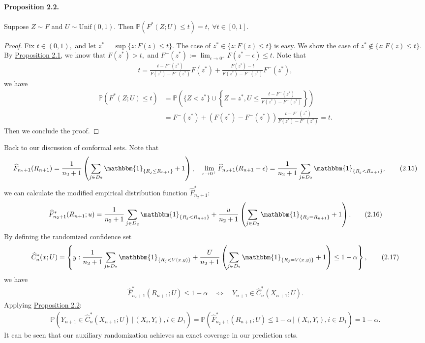 \documentclass{article}
\numberwithin{equation}{section}
\begin{document}
\paragraph{Proposition 2.2.\label{Proposition 2.2}} Suppose $Z\sim F$ and $U\sim\mathrm{Unif}(0,1)$. Then $\mathbb{P}(F^*(Z;U)\leq t) = t,\ \forall t\in [0,1]$.
\begin{proof}
Fix $t\in(0,1),$ and let $z^*=\sup\{z:F(z)\leq t\}.$ The case of $z^*\in\{z:F(z)\leq t\}$ is easy. We show the case of $z^*\notin\{z:F(z)\leq t\}.$ By \hyperref[Proposition 2.1]{Proposition 2.1}, we know that $F(z^*)>t,$ and $F^-(z^*):=\lim_{\epsilon\to 0^+}F(z^*-\epsilon) \leq t.$
Note that 
\begin{align*}
	t = \frac{t-F^-(z^*)}{F(z^*) - F^-(z^*)}F(z^*) + \frac{F(z^*) - t}{F(z^*) - F^-(z^*)}F^-(z^*),\tag{2.13}
\end{align*}
we have
\begin{align*}
	\mathbb{P}(F^*(Z;U)\leq t) &= \mathbb{P}\left(\{Z < z^*\}\cup\left\{Z=z^*,U\leq \frac{t-F^-(z^*)}{F(z^*) - F^-(z^*)}\right\}\right)\\
	&= F^-(z^*) + \left(F(z^*) - F^-(z^*)\right)\frac{t-F^-(z^*)}{F(z^*) - F^-(z^*)} = t.\tag{2.14}
\end{align*}
Then we conclude the proof.
\end{proof}

Back to our discussion of conformal sets. Note that
\begin{align*}
	\widehat{F}_{n_2+1}(R_{n+1}) = \frac{1}{n_2+1}\left(\sum_{j\in D_2}\mathbbm{1}_{\{R_j\leq R_{n+1}\}}+1\right),\quad
	\lim_{\epsilon\to 0^+}\widehat{F}_{n_2+1}(R_{n+1}-\epsilon) = \frac{1}{n_2+1}\sum_{j\in D_2}\mathbbm{1}_{\{R_j< R_{n+1}\}},\tag{2.15}
\end{align*}
we can calculate the modified empirical distribution function $\widehat{F}^*_{n_2+1}$:
\begin{align*}
	\widehat{F}_{n_2+1}^*(R_{n+1};u) = \frac{1}{n_2+1}\sum_{j\in D_2}\mathbbm{1}_{\{R_j<R_{n+1}\}} + \frac{u}{n_2+1}\left(\sum_{j\in D_2}\mathbbm{1}_{\{R_j=R_{n+1}\}} + 1\right).\tag{2.16}
\end{align*}
By defining the randomized confidence set
\begin{align*}
	\widehat{C}^*_n(x;U) = \left\{y:\frac{1}{n_2+1}\sum_{j\in D_2}\mathbbm{1}_{\{R_j<V(x,y)\}} + \frac{U}{n_2+1}\left(\sum_{j\in D_2}\mathbbm{1}_{\{R_j=V(x,y)\}} + 1\right)\leq 1-\alpha\right\},\tag{2.17}
\end{align*}
we have
\begin{align*}
	\widehat{F}_{n_2+1}^*(R_{n+1};U) \leq 1-\alpha\quad \Leftrightarrow\quad Y_{n+1}\in \widehat{C}^*_n(X_{n+1};U).\tag{2.18}
\end{align*}
Applying \hyperref[Proposition 2.2]{Proposition 2.2}:
\begin{align*}
	\mathbb{P}\left(Y_{n+1}\in \widehat{C}^*_n(X_{n+1};U)\,\big|\,(X_i,Y_i),i\in D_1\right) = \mathbb{P}\left(\widehat{F}_{n_2+1}^*(R_{n+1};U) \leq 1-\alpha\,\big|\,(X_i,Y_i),i\in D_1\right) = 1-\alpha.\tag{2.19}
\end{align*}
It can be seen that our auxiliary randomization achieves an exact coverage in our prediction sets.
\end{document}
